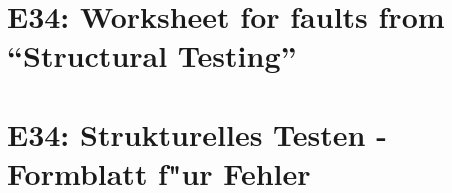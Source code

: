 
\thispagestyle{empty}
\ifenglish
\section*{E34: Worksheet for faults from ``Structural Testing''}

\fi
\ifgerman
\section*{E34: Strukturelles Testen - Formblatt f"ur Fehler}

\fi

